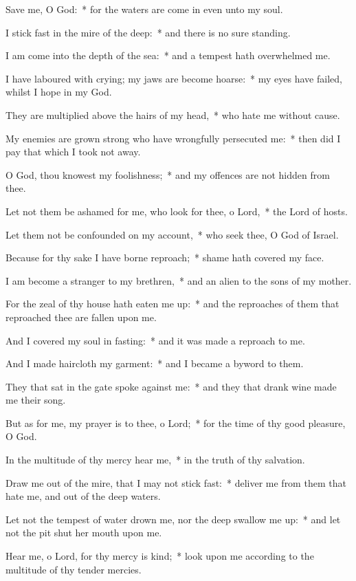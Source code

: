 \begin{enpars}
\item Save me, O God:~* for the waters are come in even unto my soul.
\item I stick fast in the mire of the deep:~* and there is no sure standing.
\item I am come into the depth of the sea:~* and a tempest hath overwhelmed me.
\item I have laboured with crying; my jaws are become hoarse:~* my eyes have failed, whilst I hope in my God.
\item They are multiplied above the hairs of my head,~* who hate me without cause.
\item My enemies are grown strong who have wrongfully persecuted me:~* then did I pay that which I took not away.
\item O God, thou knowest my foolishness;~* and my offences are not hidden from thee.
\item Let not them be ashamed for me, who look for thee, o Lord,~* the Lord of hosts.
\item Let them not be confounded on my account,~* who seek thee, O God of Israel.
\item Because for thy sake I have borne reproach;~* shame hath covered my face.
\item I am become a stranger to my brethren,~* and an alien to the sons of my mother.
\item For the zeal of thy house hath eaten me up:~* and the reproaches of them that reproached thee are fallen upon me.
\item And I covered my soul in fasting:~* and it was made a reproach to me.
\item And I made haircloth my garment:~* and I became a byword to them.
\item They that sat in the gate spoke against me:~* and they that drank wine made me their song.
\item But as for me, my prayer is to thee, o Lord;~* for the time of thy good pleasure, O God.
\item In the multitude of thy mercy hear me,~* in the truth of thy salvation.
\item Draw me out of the mire, that I may not stick fast:~* deliver me from them that hate me, and out of the deep waters.
\item Let not the tempest of water drown me, nor the deep swallow me up:~* and let not the pit shut her mouth upon me.
\item Hear me, o Lord, for thy mercy is kind;~* look upon me according to the multitude of thy tender mercies.

\end{enpars}
